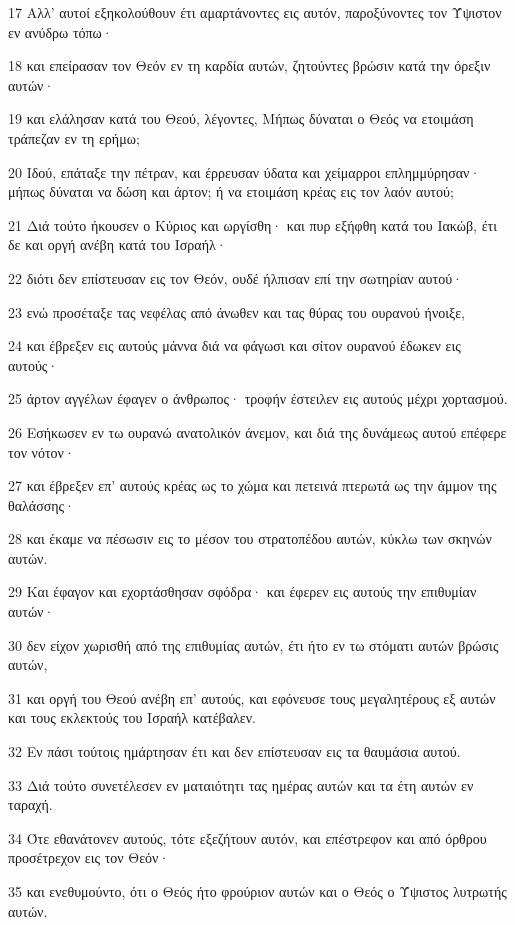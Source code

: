 \par 17 Αλλ' αυτοί εξηκολούθουν έτι αμαρτάνοντες εις αυτόν, παροξύνοντες τον Ύψιστον εν ανύδρω τόπω·
\par 18 και επείρασαν τον Θεόν εν τη καρδία αυτών, ζητούντες βρώσιν κατά την όρεξιν αυτών·
\par 19 και ελάλησαν κατά του Θεού, λέγοντες, Μήπως δύναται ο Θεός να ετοιμάση τράπεζαν εν τη ερήμω;
\par 20 Ιδού, επάταξε την πέτραν, και έρρευσαν ύδατα και χείμαρροι επλημμύρησαν· μήπως δύναται να δώση και άρτον; ή να ετοιμάση κρέας εις τον λαόν αυτού;
\par 21 Διά τούτο ήκουσεν ο Κύριος και ωργίσθη· και πυρ εξήφθη κατά του Ιακώβ, έτι δε και οργή ανέβη κατά του Ισραήλ·
\par 22 διότι δεν επίστευσαν εις τον Θεόν, ουδέ ήλπισαν επί την σωτηρίαν αυτού·
\par 23 ενώ προσέταξε τας νεφέλας από άνωθεν και τας θύρας του ουρανού ήνοιξε,
\par 24 και έβρεξεν εις αυτούς μάννα διά να φάγωσι και σίτον ουρανού έδωκεν εις αυτούς·
\par 25 άρτον αγγέλων έφαγεν ο άνθρωπος· τροφήν έστειλεν εις αυτούς μέχρι χορτασμού.
\par 26 Εσήκωσεν εν τω ουρανώ ανατολικόν άνεμον, και διά της δυνάμεως αυτού επέφερε τον νότον·
\par 27 και έβρεξεν επ' αυτούς κρέας ως το χώμα και πετεινά πτερωτά ως την άμμον της θαλάσσης·
\par 28 και έκαμε να πέσωσιν εις το μέσον του στρατοπέδου αυτών, κύκλω των σκηνών αυτών.
\par 29 Και έφαγον και εχορτάσθησαν σφόδρα· και έφερεν εις αυτούς την επιθυμίαν αυτών·
\par 30 δεν είχον χωρισθή από της επιθυμίας αυτών, έτι ήτο εν τω στόματι αυτών βρώσις αυτών,
\par 31 και οργή του Θεού ανέβη επ' αυτούς, και εφόνευσε τους μεγαλητέρους εξ αυτών και τους εκλεκτούς του Ισραήλ κατέβαλεν.
\par 32 Εν πάσι τούτοις ημάρτησαν έτι και δεν επίστευσαν εις τα θαυμάσια αυτού.
\par 33 Διά τούτο συνετέλεσεν εν ματαιότητι τας ημέρας αυτών και τα έτη αυτών εν ταραχή.
\par 34 Ότε εθανάτονεν αυτούς, τότε εξεζήτουν αυτόν, και επέστρεφον και από όρθρου προσέτρεχον εις τον Θεόν·
\par 35 και ενεθυμούντο, ότι ο Θεός ήτο φρούριον αυτών και ο Θεός ο Ύψιστος λυτρωτής αυτών.
